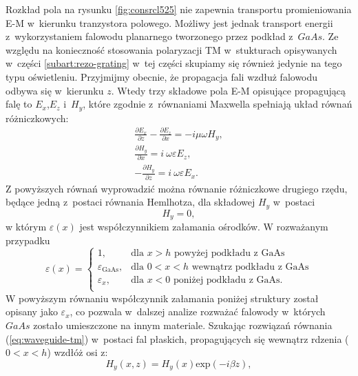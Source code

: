 Rozkład pola na rysunku \ref{fig:consrcl525} nie zapewnia transportu promieniowania E-M w~kierunku tranzystora polowego. Możliwy jest jednak transport energii z~wykorzystaniem falowodu planarnego tworzonego przez podkład z~$GaAs$. Ze względu na konieczność stosowania polaryzacji TM w~stukturach opisywanych w~części \ref{subart:rezo-grating} w~tej części skupiamy się również jedynie na tego typu oświetleniu. Przyjmijmy obecnie, że propagacja fali wzdłuż falowodu odbywa się w~kierunku $z$. Wtedy trzy składowe pola E-M opisujące propagującą falę to $E_x$,$E_z$ i~$H_y$, które zgodnie z~równaniami Maxwella spełniają układ równań różniczkowych:
\begin{equation}
\begin{gathered}
	\frac{\partial E_x}{\partial z} - \frac{\partial E_z}{\partial x} = -i \mu \omega H_y,\\	
	\frac{\partial H_y}{\partial x} = i~\omega \varepsilon E_z, \\
	- \frac{\partial H_y}{\partial z} = i~\omega \varepsilon E_x.
\end{gathered}
\end{equation}
Z powyższych równań wyprowadzić można równanie różniczkowe drugiego rzędu, będące jedną z~postaci równania Hemlhotza, dla składowej $H_y$ w~postaci
\begin{equation}
	[ \frac{\partial^2}{\partial x^2} + \frac{\partial^2}{\partial z^2} + \omega^2 \mu_0 \varepsilon (x) ] H_y = 0,
	\label{eq:waveguide-tm}
\end{equation}
w którym $\varepsilon(x)$ jest współczynnikiem załamania ośrodków. W rozważanym przypadku
\begin{equation}
\varepsilon(x)=  
\begin{cases} 
	1, & \mbox{dla } x>h\mbox{ powyżej podkładu z~GaAs } \\ 
	\varepsilon_{\textrm{GaAs}}, & \mbox{dla } 0<x<h\mbox{ wewnątrz podkładu z~GaAs} \\
	\varepsilon_x,	&	\mbox{dla } x<0\mbox{ poniżej podkładu z~GaAs}.\\
\end{cases}
\end{equation}
W powyższym równaniu współczynnik załamania poniżej struktury został opisany jako $\varepsilon_x$, co pozwala w~dalszej analize rozważać falowody w~których $GaAs$ zostało umieszczone na innym materiale. Szukając rozwiązań równania (\ref{eq:waveguide-tm}) w~postaci fal płaskich, propagujących się wewnątrz rdzenia ($0<x<h$) wzdłóż osi z:
\begin{equation}
	H_y(x,z)=H_y(x) \textrm{exp}(-i \beta z),
\end{equation}
